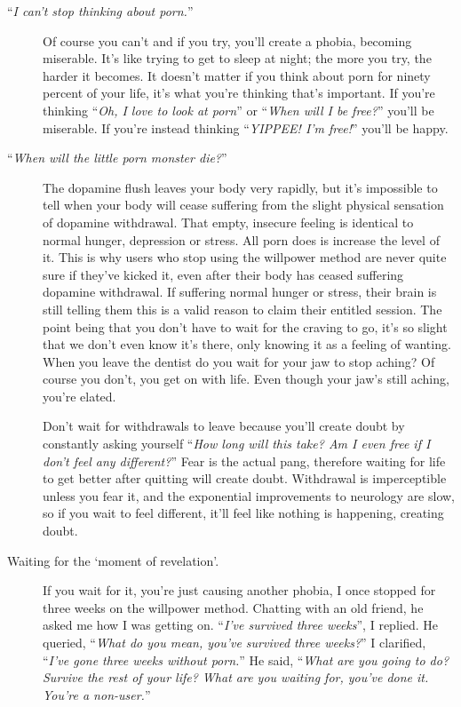 \documentclass[
]{book}
\begin{document}
\begin{description}
\begin{description}
\item[``\emph{I can't stop thinking about porn.}'']
Of course you can't and if you try, you'll create a phobia, becoming miserable. It's like trying to get to sleep at night; the more you try, the harder it becomes. It doesn't matter if you think about porn for ninety percent of your life, it's what you're thinking that's important. If you're thinking ``\emph{Oh, I love to look at porn}'' or ``\emph{When will I be free?}'' you'll be miserable. If you're instead thinking ``\emph{YIPPEE! I'm free!}'' you'll be happy.
\item[``\emph{When will the little porn monster die?}'']
The dopamine flush leaves your body very rapidly, but it's impossible to tell when your body will cease suffering from the slight physical sensation of dopamine withdrawal. That empty, insecure feeling is identical to normal hunger, depression or stress. All porn does is increase the level of it. This is why users who stop using the willpower method are never quite sure if they've kicked it, even after their body has ceased suffering dopamine withdrawal. If suffering normal hunger or stress, their brain is still telling them this is a valid reason to claim their entitled session. The point being that you don't have to wait for the craving to go, it's so slight that we don't even know it's there, only knowing it as a feeling of wanting. When you leave the dentist do you wait for your jaw to stop aching? Of course you don't, you get on with life. Even though your jaw's still aching, you're elated.

Don't wait for withdrawals to leave because you'll create doubt by constantly asking yourself ``\emph{How long will this take? Am I even free if I don't feel any different?}'' Fear is the actual pang, therefore waiting for life to get better after quitting will create doubt. Withdrawal is imperceptible unless you fear it, and the exponential improvements to neurology are slow, so if you wait to feel different, it'll feel like nothing is happening, creating doubt.
\item[Waiting for the `moment of revelation'.]
If you wait for it, you're just causing another phobia, I once stopped for three weeks on the willpower method. Chatting with an old friend, he asked me how I was getting on.
``\emph{I've survived three weeks}'', I replied.
He queried, ``\emph{What do you mean, you've survived three weeks?}''
I clarified, ``\emph{I've gone three weeks without porn.}''
He said, ``\emph{What are you going to do? Survive the rest of your life? What are you waiting for, you've done it. You're a non-user.}''


\end{description}
\end{description}
\end{document}
